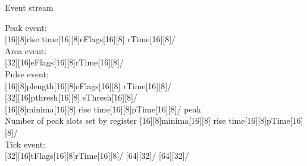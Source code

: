 \documentclass{beamer}
\begin{document}
\begin{frame}{Event stream}

  {\scriptsize Peak event:} \\
  [16][8]{rise time}[16][8]{eFlags}[16][8]
  {rTime}[16][8]/
  \\
  {\scriptsize Area event:} \\
  [32][16]{eFlags}[16][8]{rTime}[16][8]/
  \\
  {\scriptsize Pulse event:} \\
  [16][8]{plength}[16][8]{eFlags}[16][8]
  {rTime}[16][8]/
  \\
  [32][16]{pthresh}[16][8]
  {sThresh}[16][8]/
  \\
  [16][8]{minima}[16][8]
  {rise time}[16][8]{pTime}[16][8]/
  {\scriptsize peak}
  \\
  \makebox[20 pt]{} {\tiny Number of peak slots set by  register}
  [16][8]{minima}[16][8]
  {rise time}[16][8]{pTime}[16][8]/
  \\
  {\scriptsize Tick event:}\\
  [32][16]{tFlags}[16][8]{rTime}[16][8]/
  [64][32]/
  [64][32]/
  \\
\end{frame}
\end{document}
